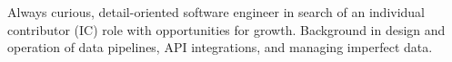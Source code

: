 
Always curious, detail-oriented software engineer in search of an individual contributor (IC) role with opportunities for growth. Background in design and operation of data pipelines, API integrations, and managing imperfect data.
